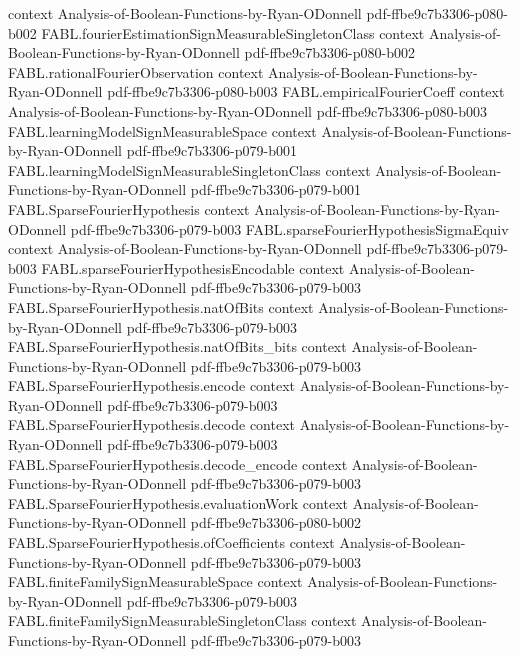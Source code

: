 \begin{theorem}
  {context}
  {Analysis-of-Boolean-Functions-by-Ryan-ODonnell}
  {pdf-ffbe9c7b3306-p080-b002}
\proofstep
  {FABL.fourierEstimationSignMeasurableSingletonClass}
  {context}
  {Analysis-of-Boolean-Functions-by-Ryan-ODonnell}
  {pdf-ffbe9c7b3306-p080-b002}
\proofstep
  {FABL.rationalFourierObservation}
  {context}
  {Analysis-of-Boolean-Functions-by-Ryan-ODonnell}
  {pdf-ffbe9c7b3306-p080-b003}
\proofstep
  {FABL.empiricalFourierCoeff}
  {context}
  {Analysis-of-Boolean-Functions-by-Ryan-ODonnell}
  {pdf-ffbe9c7b3306-p080-b003}
\proofstep
  {FABL.learningModelSignMeasurableSpace}
  {context}
  {Analysis-of-Boolean-Functions-by-Ryan-ODonnell}
  {pdf-ffbe9c7b3306-p079-b001}
\proofstep
  {FABL.learningModelSignMeasurableSingletonClass}
  {context}
  {Analysis-of-Boolean-Functions-by-Ryan-ODonnell}
  {pdf-ffbe9c7b3306-p079-b001}
\proofstep
  {FABL.SparseFourierHypothesis}
  {context}
  {Analysis-of-Boolean-Functions-by-Ryan-ODonnell}
  {pdf-ffbe9c7b3306-p079-b003}
\proofstep
  {FABL.sparseFourierHypothesisSigmaEquiv}
  {context}
  {Analysis-of-Boolean-Functions-by-Ryan-ODonnell}
  {pdf-ffbe9c7b3306-p079-b003}
\proofstep
  {FABL.sparseFourierHypothesisEncodable}
  {context}
  {Analysis-of-Boolean-Functions-by-Ryan-ODonnell}
  {pdf-ffbe9c7b3306-p079-b003}
\proofstep
  {FABL.SparseFourierHypothesis.natOfBits}
  {context}
  {Analysis-of-Boolean-Functions-by-Ryan-ODonnell}
  {pdf-ffbe9c7b3306-p079-b003}
\proofstep
  {FABL.SparseFourierHypothesis.natOfBits_bits}
  {context}
  {Analysis-of-Boolean-Functions-by-Ryan-ODonnell}
  {pdf-ffbe9c7b3306-p079-b003}
\proofstep
  {FABL.SparseFourierHypothesis.encode}
  {context}
  {Analysis-of-Boolean-Functions-by-Ryan-ODonnell}
  {pdf-ffbe9c7b3306-p079-b003}
\proofstep
  {FABL.SparseFourierHypothesis.decode}
  {context}
  {Analysis-of-Boolean-Functions-by-Ryan-ODonnell}
  {pdf-ffbe9c7b3306-p079-b003}
\proofstep
  {FABL.SparseFourierHypothesis.decode_encode}
  {context}
  {Analysis-of-Boolean-Functions-by-Ryan-ODonnell}
  {pdf-ffbe9c7b3306-p079-b003}
\proofstep
  {FABL.SparseFourierHypothesis.evaluationWork}
  {context}
  {Analysis-of-Boolean-Functions-by-Ryan-ODonnell}
  {pdf-ffbe9c7b3306-p080-b002}
\proofstep
  {FABL.SparseFourierHypothesis.ofCoefficients}
  {context}
  {Analysis-of-Boolean-Functions-by-Ryan-ODonnell}
  {pdf-ffbe9c7b3306-p079-b003}
\proofstep
  {FABL.finiteFamilySignMeasurableSpace}
  {context}
  {Analysis-of-Boolean-Functions-by-Ryan-ODonnell}
  {pdf-ffbe9c7b3306-p079-b003}
\proofstep
  {FABL.finiteFamilySignMeasurableSingletonClass}
  {context}
  {Analysis-of-Boolean-Functions-by-Ryan-ODonnell}
  {pdf-ffbe9c7b3306-p079-b003}

\end{theorem}
